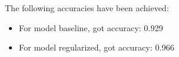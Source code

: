 \begin{answer}
The following accuracies have been achieved:
\begin{itemize}
    \item For model baseline, got accuracy: 0.929
    \item For model regularized, got accuracy: 0.966
\end{itemize}

\end{answer}
   
  
